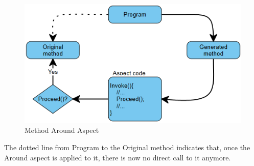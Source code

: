 \begin{figure}[here]
  \includegraphics[scale=1.0]{AroundOverview.PNG}
  \centering
  \caption{Method Around Aspect\label{around_overview}}
\end{figure}

The dotted line from Program to the Original method indicates that, once the Around aspect is applied to it, there is now no direct call to it anymore.
